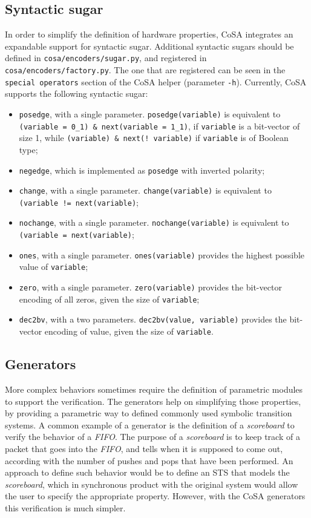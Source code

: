 \documentclass{article}
\theoremstyle{definition}
\begin{document}
\subsection{Syntactic sugar}

In order to simplify the definition of hardware properties, CoSA
integrates an expandable support for syntactic sugar. Additional
syntactic sugars should be defined in \texttt{cosa/encoders/sugar.py},
and registered in \texttt{cosa/encoders/factory.py}. The one that are
registered can be seen in the \texttt{special operators} section of
the CoSA helper (parameter \texttt{-h}). Currently, CoSA supports the
following syntactic sugar:

\begin{itemize}
\item \texttt{posedge}, with a single
  parameter. \texttt{posedge(variable)} is equivalent to \texttt{(variable
    = 0\_1) \& next(variable = 1\_1)}, if \texttt{variable} is a
  bit-vector of size 1, while \texttt{(variable) \& next(! variable)} if
  \texttt{variable} is of Boolean type;
\item \texttt{negedge}, which is implemented as \texttt{posedge} with
  inverted polarity;
\item \texttt{change}, with a single
  parameter. \texttt{change(variable)} is equivalent to
  \texttt{(variable != next(variable)};
\item \texttt{nochange}, with a single
  parameter. \texttt{nochange(variable)} is equivalent to
  \texttt{(variable = next(variable)};
\item \texttt{ones}, with a single parameter. \texttt{ones(variable)}
  provides the highest possible value of \texttt{variable};
\item \texttt{zero}, with a single parameter. \texttt{zero(variable)}
  provides the bit-vector encoding of all zeros, given the size of
  \texttt{variable};
\item \texttt{dec2bv}, with a two parameters. \texttt{dec2bv(value,
  variable)} provides the bit-vector encoding of value, given the size
  of \texttt{variable}.
\end{itemize}

\subsection{Generators}

More complex behaviors sometimes require the definition of parametric
modules to support the verification. The generators help on
simplifying those properties, by providing a parametric way to defined
commonly used symbolic transition systems. A common example of a
generator is the definition of a \emph{scoreboard} to verify the
behavior of a \emph{FIFO}. The purpose of a \emph{scoreboard} is to
keep track of a packet that goes into the \emph{FIFO}, and tells when
it is supposed to come out, according with the number of pushes and
pops that have been performed. An approach to define such behavior
would be to define an STS that models the \emph{scoreboard}, which in
synchronous product with the original system would allow the user to
specify the appropriate property. However, with the CoSA generators
this verification is much simpler.
\end{document}

